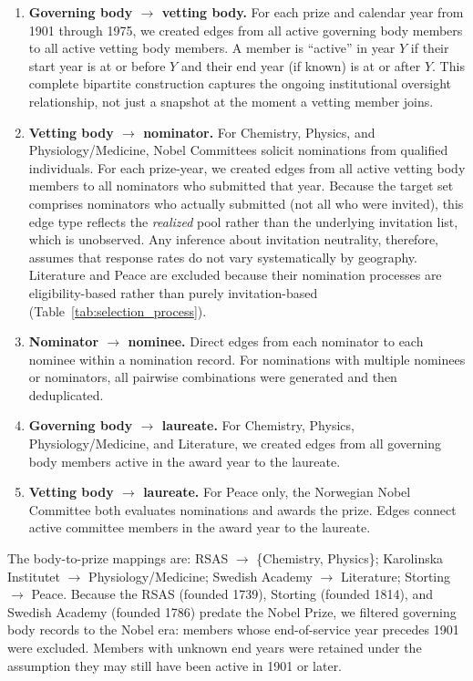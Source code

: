 \documentclass[12pt]{article}
\begin{document}
\begin{enumerate}
    \item \textbf{Governing body $\to$ vetting body.} For each prize and calendar year from 1901 through 1975, we created edges from all active governing body members to all active vetting body members. A member is ``active'' in year $Y$ if their start year is at or before $Y$ and their end year (if known) is at or after $Y$. This complete bipartite construction captures the ongoing institutional oversight relationship, not just a snapshot at the moment a vetting member joins.

    \item \textbf{Vetting body $\to$ nominator.} For Chemistry, Physics, and Physiology/Medicine, Nobel Committees solicit nominations from qualified individuals. For each prize-year, we created edges from all active vetting body members to all nominators who submitted that year. Because the target set comprises nominators who actually submitted (not all who were invited), this edge type reflects the \emph{realized} pool rather than the underlying invitation list, which is unobserved. Any inference about invitation neutrality, therefore, assumes that response rates do not vary systematically by geography. Literature and Peace are excluded because their nomination processes are eligibility-based rather than purely invitation-based (Table~\ref{tab:selection_process}).

    \item \textbf{Nominator $\to$ nominee.} Direct edges from each nominator to each nominee within a nomination record. For nominations with multiple nominees or nominators, all pairwise combinations were generated and then deduplicated.

    \item \textbf{Governing body $\to$ laureate.} For Chemistry, Physics, Physiology/Medicine, and Literature, we created edges from all governing body members active in the award year to the laureate.

    \item \textbf{Vetting body $\to$ laureate.} For Peace only, the Norwegian Nobel Committee both evaluates nominations and awards the prize. Edges connect active committee members in the award year to the laureate.
\end{enumerate}

The body-to-prize mappings are: RSAS $\to$ \{Chemistry, Physics\}; Karolinska Institutet $\to$ Physiology/Medicine; Swedish Academy $\to$ Literature; Storting $\to$ Peace. Because the RSAS (founded 1739), Storting (founded 1814), and Swedish Academy (founded 1786) predate the Nobel Prize, we filtered governing body records to the Nobel era: members whose end-of-service year precedes 1901 were excluded. Members with unknown end years were retained under the assumption they may still have been active in 1901 or later.
\end{document}
